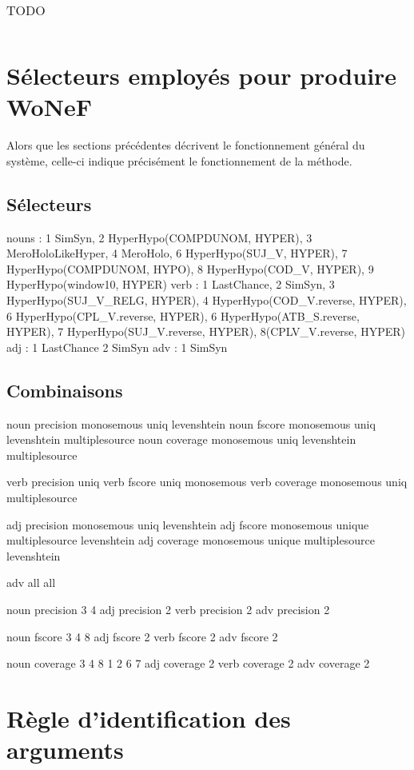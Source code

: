\documentclass[oneside,parskip,draft]{scrbook}
\begin{document}
\begin{longtable}{lll}
    \caption{\label{table:relationswonef} TODO}
\end{longtable}



\section{Sélecteurs employés pour produire WoNeF}

Alors que les sections précédentes décrivent le fonctionnement général du
système, celle-ci indique précisément le fonctionnement de la méthode.

\subsection{Sélecteurs}

nouns : 1 SimSyn, 2 HyperHypo(COMPDUNOM, HYPER), 3 MeroHoloLikeHyper, 4
MeroHolo, 6 HyperHypo(SUJ\_V, HYPER), 7 HyperHypo(COMPDUNOM, HYPO), 8
HyperHypo(COD\_V, HYPER), 9 HyperHypo(window10, HYPER)
verb :  1 LastChance, 2 SimSyn, 3 HyperHypo(SUJ\_V\_RELG, HYPER), 4
HyperHypo(COD\_V.reverse, HYPER), 6 HyperHypo(CPL\_V.reverse, HYPER), 6
HyperHypo(ATB\_S.reverse, HYPER), 7 HyperHypo(SUJ\_V.reverse, HYPER),
8(CPLV\_V.reverse, HYPER)
adj : 1 LastChance 2 SimSyn
adv : 1 SimSyn

\subsection{Combinaisons}

noun precision monosemous uniq levenshtein
noun fscore monosemous uniq levenshtein multiplesource
noun coverage monosemous uniq levenshtein multiplesource

verb precision uniq
verb fscore uniq monosemous
verb coverage monosemous uniq multiplesource

adj precision monosemous uniq levenshtein
adj fscore    monosemous unique multiplesource levenshtein
adj coverage  monosemous unique multiplesource levenshtein

adv all all

noun precision 3 4
adj precision 2
verb precision 2
adv precision 2

noun fscore 3 4 8
adj fscore 2
verb fscore 2
adv fscore 2

noun coverage 3 4 8 1 2 6 7
adj coverage 2
verb coverage 2
adv coverage 2

\section{Règle d'identification des arguments}
\label{argument_identification}
\end{document}
